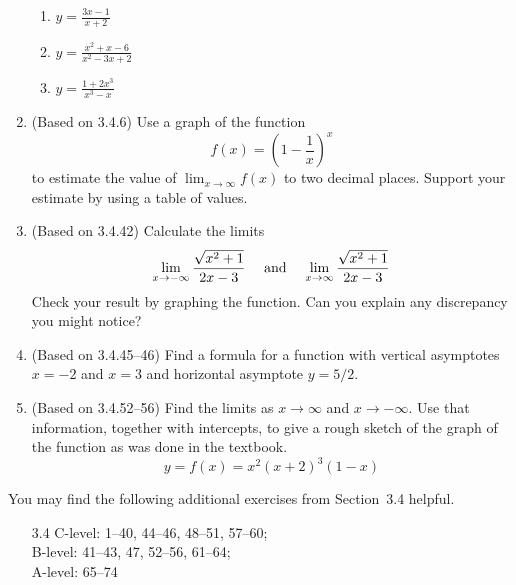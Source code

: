 \documentclass[11pt]{article}
\newcommand{\ds}{\displaystyle}
\begin{document}
\begin{enumerate}
\begin{multicols}{3}
  \begin{enumerate}
  \item $\ds y=\frac{3x-1}{x+2}$
  \item $\ds y=\frac{x^2+x-6}{x^2-3x+2}$
  \item $\ds y=\frac{1+2x^3}{x^3-x}$
  \end{enumerate}
  \end{multicols}
\item (Based on 3.4.6) %
  Use a graph of the function
  \begin{equation*}
    f(x) = \left(1-\frac{1}{x}\right)^x
  \end{equation*}
  to estimate the value of $\ds \lim_{x\to\infty} f(x)$ to two decimal
  places.  Support your estimate by using a table of values.
\item (Based on 3.4.42) %
  Calculate the limits
  \begin{equation*}
    \mbox{$\ds \lim_{x\to -\infty} \frac{\sqrt{x^2+1}}{2x-3}$
    \quad and \quad $\ds \lim_{x\to \infty} \frac{\sqrt{x^2+1}}{2x-3}$}
  \end{equation*}
  Check your result by graphing the function.  Can you explain any 
  discrepancy you might notice?
\item (Based on 3.4.45--46) %
  Find a formula for a function with vertical asymptotes $x=-2$ and
  $x=3$ and horizontal asymptote $y=5/2$.
\item (Based on 3.4.52--56) %
  Find the limits as $x\to \infty$ and $x\to -\infty$.  Use that
  information, together with intercepts, to give a rough sketch of the
  graph of the function as was done in the textbook.
  \begin{equation*}
    y = f(x) = x^2(x+2)^3(1-x)
  \end{equation*}
\end{enumerate}

\noindent
You may find the following additional exercises from Section~3.4
helpful.
\begin{itemize}
\item[3.4] 
  C-level: 1--40, 44--46, 48--51, 57--60; \\
  B-level: 41--43, 47, 52--56, 61--64; \\
  A-level: 65--74
\end{itemize}
\end{document}

